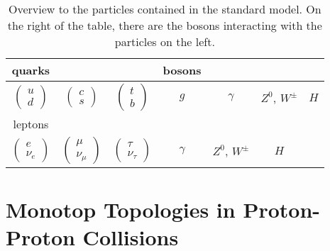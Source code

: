 \begin{table}
\centering
\begin{tabular}{|c c c |c c c c|}
	\hline 
	quarks &  &  & bosons &  &  &  \\ 
	\hline 
	$
	\left(\begin{array}{c}
		u \\ 
		d 
	\end{array}\right)
	$
	 & 
	 $
	 \left(\begin{array}{c}
	 c \\ 
	 s 
	 \end{array}\right)
	 $&
	 $
	 \left(\begin{array}{c}
	 t \\ 
	 b 
	 \end{array}\right)
	 $  &  $g$  & $\gamma$ & $Z^0$, $W^{\pm}$  & $H$  \\ 
	\hline 
	leptons &  &  & & & &  \\ 
	
	\hline 
	$
	\left(\begin{array}{c}
	e \\ 
	\nu_e 
	\end{array}\right)
	$
	& 
	$
	\left(\begin{array}{c}
	\mu \\ 
	\nu_\mu 
	\end{array}\right)
	$&
	$
	\left(\begin{array}{c}
	\tau \\ 
	\nu_\tau 
	\end{array}\right)
	$  & $\gamma$ & $Z^0$, $W^{\pm}$ & $H$ &  \\ 
	\hline 
\end{tabular}
\caption{Overview to the particles contained in the standard model.
	On the right of the table, there are the bosons interacting with the particles on the left.}
\label{StandardModel}
\end{table}


\section{Monotop Topologies in Proton-Proton Collisions}

